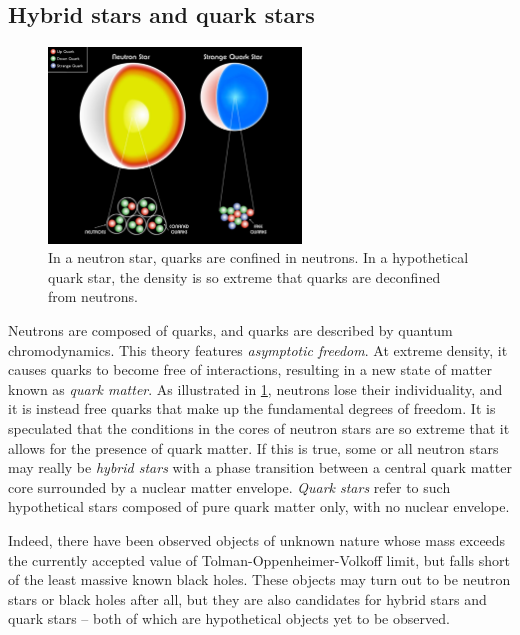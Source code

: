 \subsection*{Hybrid stars and quark stars}

\begin{figure}
\centering
\includegraphics[width=0.6\textwidth]{figures/neutron-quark-star-optimized.jpg}
\caption{\label{fig:conclusion:neutron_vs_quark_star}%
	In a neutron star, quarks are confined in neutrons.
	In a hypothetical quark star, the density is so extreme that quarks are deconfined from neutrons.
}
\end{figure}

Neutrons are composed of quarks, and quarks are described by quantum chromodynamics.
This theory features \emph{asymptotic freedom}.
At extreme density, it causes quarks to become free of interactions, resulting in a new state of matter known as \emph{quark matter}.
As illustrated in \cref{fig:conclusion:neutron_vs_quark_star}, neutrons lose their individuality, and it is instead free quarks that make up the fundamental degrees of freedom.
It is speculated that the conditions in the cores of neutron stars are so extreme that it allows for the presence of quark matter.
If this is true, some or all neutron stars may really be \emph{hybrid stars} with a phase transition between a central quark matter core surrounded by a nuclear matter envelope.
\emph{Quark stars} refer to such hypothetical stars composed of pure quark matter only, with no nuclear envelope.
\cite[chapter 8]{ref:glendenning}

Indeed, there have been observed objects of unknown nature whose mass exceeds the currently accepted value of Tolman-Oppenheimer-Volkoff limit, but falls short of the least massive known black holes. \cite{ref:wiki_list_star_massess}
These objects may turn out to be neutron stars or black holes after all, but they are also candidates for hybrid stars and quark stars -- both of which are hypothetical objects yet to be observed.

